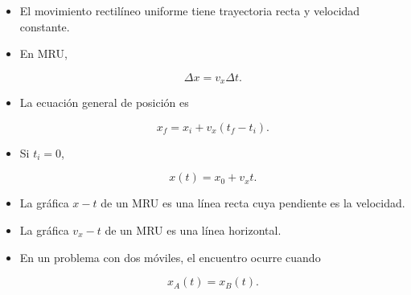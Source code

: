 \begin{resumen}
\begin{itemize}
    \item El movimiento rectilíneo uniforme tiene trayectoria recta y
    velocidad constante.

    \item En MRU,

    \[
    \boxed{\Delta x=v_x\Delta t}.
    \]

    \item La ecuación general de posición es

    \[
    \boxed{x_f=x_i+v_x(t_f-t_i)}.
    \]

    \item Si \(t_i=0\),

    \[
    \boxed{x(t)=x_0+v_xt}.
    \]

    \item La gráfica \(x-t\) de un MRU es una línea recta cuya pendiente es
    la velocidad.

    \item La gráfica \(v_x-t\) de un MRU es una línea horizontal.

    \item En un problema con dos móviles, el encuentro ocurre cuando

    \[
    \boxed{x_A(t)=x_B(t)}.
    \]

\end{itemize}

\end{resumen}